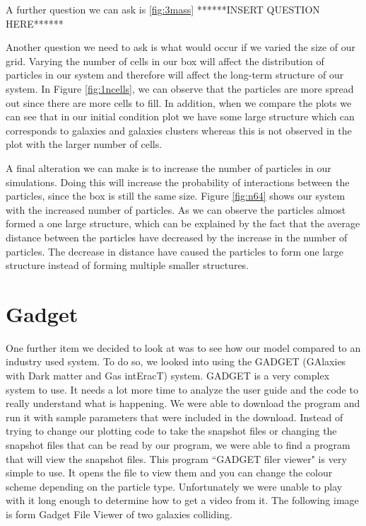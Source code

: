\documentclass[10pt]{article}
\begin{document}
	A further question we can ask is \ref{fig:3mass} ******INSERT QUESTION HERE******

	Another question we need to ask is what would occur if we varied the size of our grid. Varying the number of cells in our box will affect the distribution of particles in our system and therefore will affect the long-term structure of our system. In Figure \ref{fig:1ncells}, we can observe that the particles are more spread out since there are more cells to fill. In addition, when we compare the plots we can see that in our initial condition plot we have some large structure which can corresponds to galaxies and galaxies clusters whereas this is not observed in the plot with the larger number of cells. 
	
	A final alteration we can make is to increase the number of particles in our simulations. Doing this will increase the probability of interactions between the particles, since the box is still the same size. Figure \ref{fig:n64} shows our system with the increased number of particles. As we can observe the particles almost formed a one large structure, which can be explained by the fact that the average distance between the particles have decreased by the increase in the number of particles. The decrease in distance have caused the particles to form one large structure instead of forming multiple smaller structures.   



\section{Gadget}
	One further item we decided to look at was to see how our model compared to an industry used system. To do so, we looked into using the GADGET (GAlaxies with Dark matter and Gas intEracT) system.
	GADGET is a very complex system to use. It needs a lot more time to analyze the user guide and the code to really understand what is happening. We were able to download the program and run it with sample parameters that were included in the download. Instead of trying to change our plotting code to take the snapshot files or changing the snapshot files that can be read by our program, we were able to find a program that will view the snapshot files. This program ``GADGET filer viewer" is very simple to use. It opens the file to view them and you can change the colour scheme depending on the particle type. Unfortunately we were unable to play with it long enough to determine how to get a video from it. The following image is form Gadget File Viewer of two galaxies colliding.
\end{document}
